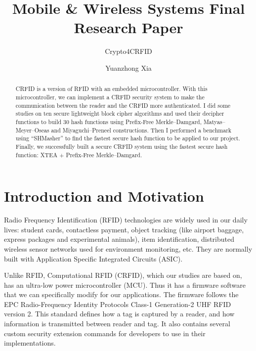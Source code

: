 \documentclass[sigconf, review=false]{acmart}
\let\OldTexttrademark\texttrademark
\renewcommand{\texttrademark}{\OldTexttrademark\xspace}%
\begin{document}
\title{Mobile \& Wireless Systems Final Research Paper}
\subtitle{Crypto4CRFID}

\author{Yuanzhong Xia}

\begin{abstract}
    CRFID is a version of RFID with an embedded microcontroller.
    With this microcontroller, we can implement a CRFID security system to make the communication between the reader and the CRFID more authenticated.
    I did some studies on ten secure lightweight block cipher algorithms and used their decipher functions to build 30 hash functions
    using Prefix-Free Merkle--Damgard, Matyas--Meyer--Oseas and Miyaguchi--Preneel constructions.
    Then I performed a benchmark using ``SHMasher'' to find the fastest secure hash function to be applied to our project.
    Finally, we successfully built a secure CRFID system using the fastest secure hash function: XTEA + Prefix-Free Merkle--Damgard.
\end{abstract}
\maketitle



\section{Introduction and Motivation}
Radio Frequency Identification (RFID) technologies are widely used in our daily lives:
student cards, contactless payment, object tracking (like airport baggage, express packages and experimental animals),
item identification, distributed wireless sensor networks used for environment monitoring, etc. \cite{wikipedia2017rfid}
They are normally built with Application Specific Integrated Circuits (ASIC).

Unlike RFID, Computational RFID (CRFID), which our studies are based on, has an ultra-low power microcontroller (MCU).
Thus it has a firmware software that we can specifically modify for our applications.
The firmware follows the EPC\texttrademark Radio-Frequency Identity Protocols Class-1 Generation-2 UHF RFID version 2\cite{epcglobal2013}.
This standard defines how a tag is captured by a reader, and how information is transmitted between reader and tag.
It also contains several custom security extension commands for developers to use in their implementations.
\end{document}

